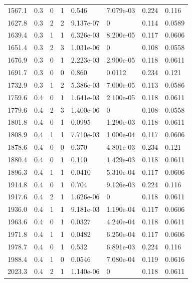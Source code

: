 \documentclass[preview]{standalone}
\begin{document}
{{{\begin{tabular}{L{1.2cm}C{1.2cm} C{0.3cm}C{0.5cm} C{1.4cm}C{1.4cm} C{1.4cm}C{1.4cm}}
  1567.1  &   0.3  & 0     &  1 &  0.546  & 7.079e-03  & 0.224 &  0.116   \\ 
  1627.8  &   0.3  & 2     &  2 &  9.137e-07  & 0  & 0.114 &  0.0589   \\ 
  1639.4  &   0.3  & 1     &  1 &  6.326e-03  & 8.200e-05  & 0.117 &  0.0606   \\ 
  1651.4  &   0.3  & 2     &  3 &  1.031e-06  & 0  & 0.108 &  0.0558   \\ 
  1676.9  &   0.3  & 0     &  1 &  2.223e-03  & 2.900e-05  & 0.118 &  0.0611   \\ 
  1691.7  &   0.3  & 0     &  0 &  0.860  & 0.0112  & 0.234 &  0.121   \\ 
  1732.9  &   0.3  & 1     &  2 &  5.386e-03  & 7.000e-05  & 0.113 &  0.0586   \\ 
  1759.6  &   0.4  & 0     &  1 &  1.641e-03  & 2.100e-05  & 0.118 &  0.0611   \\ 
  1779.6  &   0.4  & 2     &  3 &  1.400e-06  & 0  & 0.108 &  0.0558   \\ 
  1801.8  &   0.4  & 0     &  1 &  0.0995  & 1.290e-03  & 0.118 &  0.0611   \\ 
  1808.9  &   0.4  & 1     &  1 &  7.710e-03  & 1.000e-04  & 0.117 &  0.0606   \\ 
  1878.6  &   0.4  & 0     &  0 &  0.370  & 4.801e-03  & 0.234 &  0.121   \\ 
  1880.4  &   0.4  & 0     &  1 &  0.110  & 1.429e-03  & 0.118 &  0.0611   \\ 
  1896.3  &   0.4  & 1     &  1 &  0.0410  & 5.310e-04  & 0.117 &  0.0606   \\ 
  1914.8  &   0.4  & 0     &  1 &  0.704  & 9.126e-03  & 0.224 &  0.116   \\ 
  1917.6  &   0.4  & 2     &  1 &  1.626e-06  & 0  & 0.118 &  0.0611   \\ 
  1936.0  &   0.4  & 1     &  1 &  9.181e-03  & 1.190e-04  & 0.117 &  0.0606   \\ 
  1963.6  &   0.4  & 0     &  1 &  0.0327  & 4.240e-04  & 0.118 &  0.0611   \\ 
  1971.8  &   0.4  & 1     &  1 &  0.0482  & 6.250e-04  & 0.117 &  0.0606   \\ 
  1978.7  &   0.4  & 0     &  1 &  0.532  & 6.891e-03  & 0.224 &  0.116   \\ 
  1988.4  &   0.4  & 1     &  0 &  0.0546  & 7.080e-04  & 0.119 &  0.0616   \\ 
  2023.3  &   0.4  & 2     &  1 &  1.140e-06  & 0  & 0.118 &  0.0611   \\ 

\end{tabular}}}}
\end{document}
